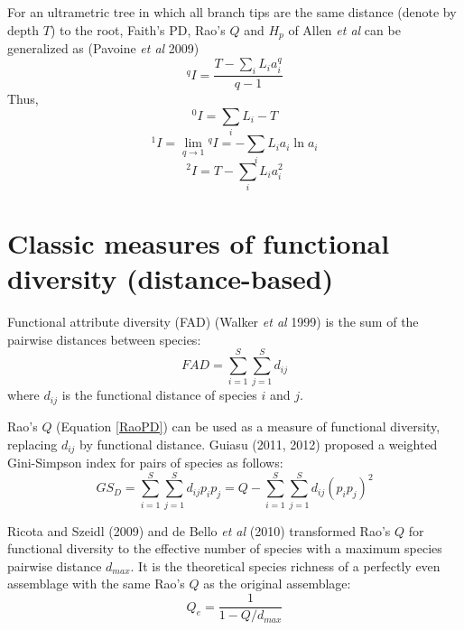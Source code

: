 \documentclass[11pt]{article}
\begin{document}
For an ultrametric tree in which all branch tips are the same distance (denote by depth $T$) to the root, Faith's PD, Rao's $Q$ and $H_p$ of Allen \textit{et al} can be generalized as (Pavoine \textit{et al} 2009)
\begin{equation}
    ^{q}I = \frac{T-\sum\limits_{i}L_ia_i^q}{q-1}
    \label{GeneralizedPD}
\end{equation}
Thus,
\begin{equation}
    ^{0}I = \sum\limits_{i}L_i - T
\end{equation}
\begin{equation}
    ^{1}I = \lim_{q\rightarrow 1} {^{q}I} = -\sum\limits_{i}L_ia_i\ln a_i
\end{equation}
\begin{equation}
    ^{2}I = T-\sum\limits_{i}L_i a_i^2
\end{equation}

\section{Classic measures of functional diversity (distance-based)}
Functional attribute diversity (FAD) (Walker \textit{et al} 1999) is the sum of the pairwise distances between species: 
\begin{equation}
    FAD = \sum\limits_{i=1}^{S}\sum\limits_{j=1}^{S}d_{ij}
    \label{FAD}
\end{equation}
where $d_{ij}$ is the functional distance of species $i$ and $j$.

\newline

Rao's $Q$ (Equation \ref{RaoPD}) can be used as a measure of functional diversity, replacing $d_{ij}$ by functional distance. 
Guiasu (2011, 2012) proposed a weighted Gini-Simpson index for pairs of species as follows:
\begin{equation}
    GS_D = \sum\limits_{i=1}^{S}\sum\limits_{j=1}^{S}d_{ij}p_ip_j = Q-\sum\limits_{i=1}^{S}\sum\limits_{j=1}^{S}d_{ij}(p_ip_j)^2
    \label{Guiasu}
\end{equation}

\newline

Ricota and Szeidl (2009) and de Bello \textit{et al} (2010) transformed Rao's $Q$ for functional diversity to the effective number of species with a maximum species pairwise distance $d_{max}$. 
It is the theoretical species richness of a perfectly even assemblage with the same Rao's $Q$ as the original assemblage:
\begin{equation}
    Q_e = \frac{1}{1-Q/d_{max}}
    \label{EffectiveRichnessQ}
\end{equation}
\end{document}
